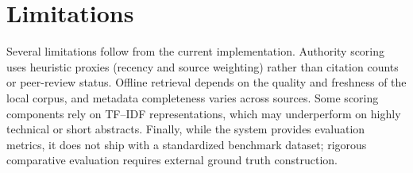 \section{Limitations}
Several limitations follow from the current implementation. Authority scoring uses heuristic proxies (recency and source weighting) rather than citation counts or peer-review status. Offline retrieval depends on the quality and freshness of the local corpus, and metadata completeness varies across sources. Some scoring components rely on TF--IDF representations, which may underperform on highly technical or short abstracts. Finally, while the system provides evaluation metrics, it does not ship with a standardized benchmark dataset; rigorous comparative evaluation requires external ground truth construction.
